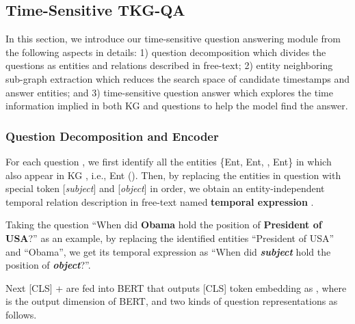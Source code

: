 \documentclass[11pt]{article}
\begin{document}
\subsection{Time-Sensitive TKG-QA}

In this section, we introduce our time-sensitive question answering module from the following aspects in details: 1) question decomposition which divides the questions as entities and relations described in free-text; 2) entity neighboring sub-graph extraction which reduces the search space of candidate timestamps and answer entities; and 3) time-sensitive question answer which explores the time information implied in both KG and questions to help the model find the answer.


\begin{comment}
In this section, a multi-step temporal QA framework is proposed for temporal reasoning.
To answer a temporal question, multiple steps are needed including limiting the scope of candidates to identify the exact answer, understanding the temporal expression, locating the occurrence time, and then finding the answers. 
Importantly, a model that has the sensitiveness of the temporal expressions and their nuanced difference of time expressions (e.g., before and after) will be important for answering the questions.
\end{comment}

\subsubsection{Question Decomposition and Encoder}
\label{sec3_5}

For each question , we first identify all the entities \{Ent, Ent, , Ent\} in  which also appear in KG , i.e., Ent ().
Then, by replacing the entities in question  with special token [\textit{subject}] and [\textit{object}] in order, we obtain an entity-independent temporal relation description in free-text named \textbf{temporal expression} .


Taking the question ``When did \textbf{Obama} hold the position of \textbf{President of USA}?'' as an example, by replacing the identified entities ``President of USA'' and ``Obama'', we get its temporal expression as ``When did \textbf{\textit{subject}} hold the position of \textbf{\textit{object}}?''.



Next [CLS] +  are fed into BERT that outputs [CLS] token embedding as , where  is the output dimension of BERT, and two kinds of question representations as follows.
\end{document}
